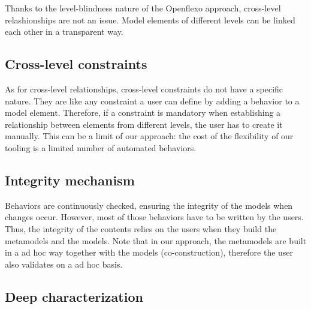 
  Thanks to the level-blindness nature of the Openflexo approach, cross-level
  relashionships are not an issue. Model elements of different levels can be
  linked each other in a transparent way. %

  \subsection{Cross-level constraints}


  As for cross-level relationships, cross-level constraints do not have a
  specific nature. They are like any constraint a user can define by adding a behavior to a model element. Therefore, if a constraint is mandatory when establishing a
  relationship between elements from different levels, the user has to create
  it manually. This can be a limit of our approach: the cost of the flexibility of our tooling is a limited number of automated behaviors. 
  
  

  \subsection{Integrity mechanism}


  Behaviors are continuously checked, ensuring the integrity of the models when changes occur. 
  However, most of those behaviors have to be written by the users. 
  Thus, the integrity of the contents relies on the users when they build the metamodels and the models.
  Note that in our approach, the metamodels are built in a ad hoc way together with the models
  (co-construction), therefore the user also validates on a ad hoc basis.

  \subsection{Deep characterization}

